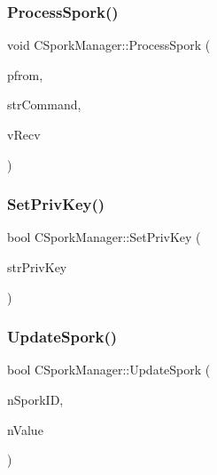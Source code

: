 \mbox{\label{class_c_spork_manager_a8df4572333ec2ba0ec49b7a70eb4ae8a}} 
\subsubsection{\texorpdfstring{Process\+Spork()}{ProcessSpork()}}
{\footnotesize\ttfamily void C\+Spork\+Manager\+::\+Process\+Spork (\begin{DoxyParamCaption}\item[{\mbox{\hyperlink{class_c_node}{C\+Node}} $\ast$}]{pfrom,  }\item[{std\+::string \&}]{str\+Command,  }\item[{\mbox{\hyperlink{class_c_data_stream}{C\+Data\+Stream}} \&}]{v\+Recv }\end{DoxyParamCaption})}

\mbox{\label{class_c_spork_manager_a599d088218de9d242e4dc5cb17dd310b}} 
\subsubsection{\texorpdfstring{Set\+Priv\+Key()}{SetPrivKey()}}
{\footnotesize\ttfamily bool C\+Spork\+Manager\+::\+Set\+Priv\+Key (\begin{DoxyParamCaption}\item[{std\+::string}]{str\+Priv\+Key }\end{DoxyParamCaption})}

\mbox{\label{class_c_spork_manager_afb7e15fe29bd548939657a20ca5feafb}} 
\subsubsection{\texorpdfstring{Update\+Spork()}{UpdateSpork()}}
{\footnotesize\ttfamily bool C\+Spork\+Manager\+::\+Update\+Spork (\begin{DoxyParamCaption}\item[{int}]{n\+Spork\+ID,  }\item[{int64\+\_\+t}]{n\+Value }\end{DoxyParamCaption})}



